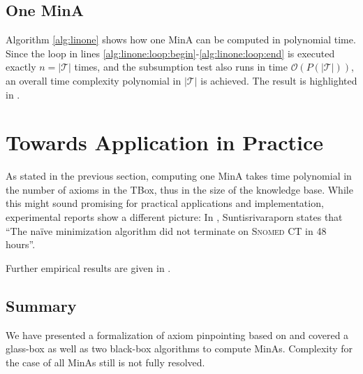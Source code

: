 \documentclass{llncs}
\newcommand{\tb}{\ensuremath{\mathcal{T}}\xspace} %
\newcommand{\snomed}{\textsc{Snomed CT}\xspace}
\begin{document}
\subsection{One MinA}
\label{sec:one}

Algorithm \ref{alg:linone} shows how one MinA can be computed in polynomial time. Since the loop in lines \ref{alg:linone:loop:begin}-\ref{alg:linone:loop:end} is executed exactly $n = |\tb|$ times, and the subsumption test also runs in time $\mathcal{O}(P(|\tb|))$, an overall time complexity polynomial in $|\tb|$ is achieved. The result is highlighted in \cite[Thm.~6]{orig1,orig2}.

\section{Towards Application in Practice}

As stated in the previous section, computing one MinA takes time polynomial in the number of axioms in the TBox, thus in the size of the knowledge base. While this might sound promising for practical applications and implementation, experimental reports show a different picture: In \cite[Sec.~5.2, p.~97]{meng-phd}, Suntisrivaraporn states that \enquote{The na\"{i}ve minimization algorithm did not terminate on \snomed in 48 hours}.

Further empirical results are given in \cite[Sec.~6.2.5, p.~127]{meng-phd}.

\subsection{Summary}

We have presented a formalization of axiom pinpointing based on \cite{orig1,orig2} and covered a glass-box as well as two black-box algorithms to compute MinAs. Complexity for the case of all MinAs still is not fully resolved.


\end{document}
